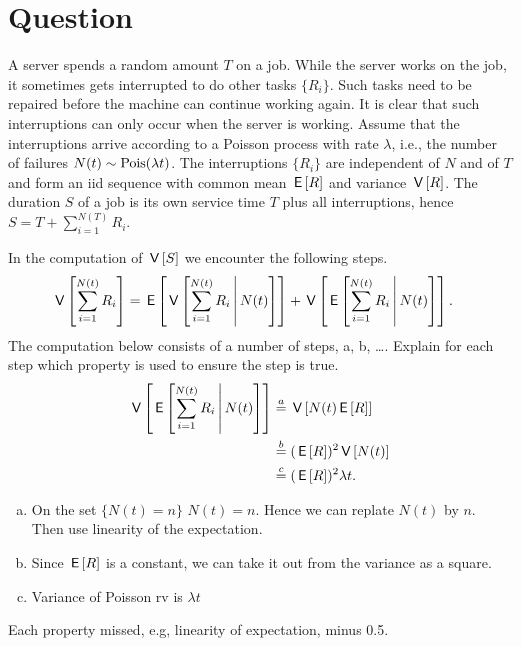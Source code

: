 \section{Question}


A server  spends a random amount $T$ on a job.
While the server works on the job, it sometimes gets interrupted to do other tasks $\{R_{i}\}$.
Such tasks need to be repaired before the machine can continue working again.
It is clear that such interruptions can only occur when the server is working.
Assume that the interruptions arrive according to a Poisson process with rate $\lambda$, i.e., the number of failures $N(t) \sim\mathrm{Pois}(\lambda t)$.
The interruptions $\{R_{i}\}$ are independent of $N$ and of $T$ and form an iid sequence with common mean $\,\mathsf{E}\left[R\right]$ and variance $\,\mathsf{V}\left[R\right]$.
The  duration $S$ of a job  is its own service time $T$ plus all interruptions, hence $S = T+ \sum_{i=1}^{N(T)} R_{i}$.

\begin{exercise}[1.5]
In the computation of $\,\mathsf{V}\left[S\right]$ we encounter the following steps.
\begin{align}
\,\mathsf{V}\left[\sum_{i=1}^{N(t)} R_{i}\right] &= \,\mathsf{E}\left[\,\mathsf{V}\left[\sum_{i=1}^{N(t)} R_{i}\,\middle|\, N(t)\right]\right] + \,\mathsf{V}\left[\,\mathsf{E}\left[\sum_{i=1}^{N(t)} R_{i}\,\middle|\, N(t)\right]\right].
\end{align}
The computation below consists of a number of steps, a, b, \ldots. Explain for each step which property is used to ensure the step is true.
\begin{align}
\,\mathsf{V}\left[\,\mathsf{E}\left[\sum_{i=1}^{N(t)} R_{i}\,\middle|\, N(t)\right]\right]
  &\stackrel{a}{=} \,\mathsf{V}\left[N(t)\,\mathsf{E}\left[R\right]\right] \\
  &\stackrel{b}{=} (\,\mathsf{E}\left[R\right])^{2} \,\mathsf{V}\left[N(t)\right] \\
  &\stackrel{c}{=} (\,\mathsf{E}\left[R\right])^{2} \lambda t.
\end{align}
\begin{solution}
  \begin{enumerate}[a.]
  \item  On the set $\{N(t)=n\}$ $N(t)=n$. Hence we can replate  $N(t)$ by $n$. Then use linearity of the expectation.
  \item  Since $\,\mathsf{E}\left[R\right]$ is a constant, we can take it out from the variance as a square.
   \item  Variance of Poisson rv is $\lambda t$
  \end{enumerate}
Each  property missed, e.g, linearity of expectation, minus 0.5.
\end{solution}
\end{exercise}



